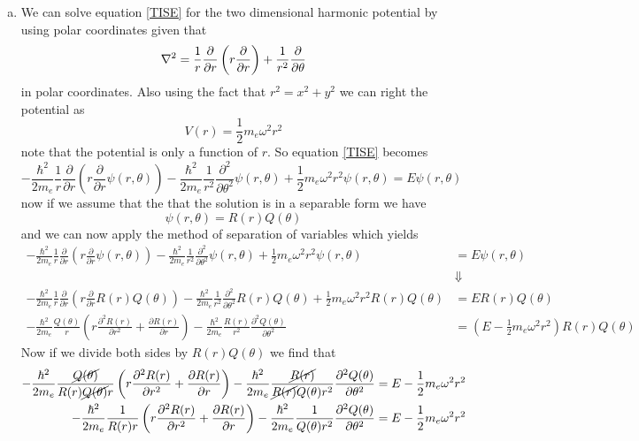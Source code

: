 \documentclass[11pt]{article}
\numberwithin{equation}{section}
\begin{document}
\begin{enumerate}[(a)]
\item
We can solve equation \ref{TISE} for the two dimensional harmonic potential by using polar coordinates given that
$$\bold\nabla^2 = \frac{1}{r}\frac{\partial}{\partial r}\left(r\frac{\partial}{\partial r}\right) + \frac{1}{r^2}\frac{\partial}{\partial\theta}$$
in polar coordinates. Also using the fact that $r^2 = x^2+y^2$ we can right the potential as
$$V(r) = \frac{1}{2}m_e\omega^2r^2$$
note that the potential is only a function of $r$. So equation \ref{TISE} becomes
$$-\frac{\hbar^2}{2m_e}\frac{1}{r}\frac{\partial}{\partial r}\left(r\frac{\partial}{\partial r}\psi(r,\theta)\right) - \frac{\hbar^2}{2m_e}\frac{1}{r^2}\frac{\partial^2}{\partial\theta^2}\psi(r,\theta) + \frac{1}{2}m_e\omega^2r^2\psi(r,\theta) = E\psi(r,\theta)$$
now if we assume that the that the solution is in a separable form we have
$$\psi(r,\theta ) = R(r)Q(\theta)$$
and we can now apply the method of separation of variables which yields
\begin{align*}
-\frac{\hbar^2}{2m_e}\frac{1}{r}\frac{\partial}{\partial r}\left(r\frac{\partial}{\partial r}\psi(r,\theta)\right) - \frac{\hbar^2}{2m_e}\frac{1}{r^2}\frac{\partial^2}{\partial\theta^2}\psi(r,\theta) + \frac{1}{2}m_e\omega^2r^2\psi(r,\theta) &= E\psi(r,\theta) \\
&\Downarrow \\
-\frac{\hbar^2}{2m_e}\frac{1}{r}\frac{\partial}{\partial r}\left(r\frac{\partial}{\partial r}R(r)Q(\theta)\right) - \frac{\hbar^2}{2m_e}\frac{1}{r^2}\frac{\partial^2}{\partial\theta^2}R(r)Q(\theta) + \frac{1}{2}m_e\omega^2r^2R(r)Q(\theta) &= ER(r)Q(\theta)\\
-\frac{\hbar^2}{2m_e}\frac{Q(\theta)}{r}\left(r\frac{\partial^2 R(r)}{\partial r^2} + \frac{\partial R(r)}{\partial r}\right) - \frac{\hbar^2}{2m_e}\frac{R(r)}{r^2}\frac{\partial^2 Q(\theta)}{\partial\theta^2} &= \left(E -\frac{1}{2}m_e\omega^2r^2\right)R(r)Q(\theta)
\end{align*}
Now if we divide both sides by $R(r)Q(\theta)$ we find that
\begin{align*}
-\frac{\hbar^2}{2m_e}\frac{\cancel{Q(\theta)}}{R(r)\cancel{Q(\theta)}r}\left(r\frac{\partial^2 R(r)}{\partial r^2} + \frac{\partial R(r)}{\partial r}\right) - \frac{\hbar^2}{2m_e}\frac{\cancel{R(r)}}{\cancel{R(r)}Q(\theta)r^2}\frac{\partial^2 Q(\theta)}{\partial\theta^2} &= E -\frac{1}{2}m_e\omega^2r^2\\
-\frac{\hbar^2}{2m_e}\frac{1}{R(r)r}\left(r\frac{\partial^2 R(r)}{\partial r^2} + \frac{\partial R(r)}{\partial r}\right) - \frac{\hbar^2}{2m_e}\frac{1}{Q(\theta)r^2}\frac{\partial^2 Q(\theta)}{\partial\theta^2} &= E -\frac{1}{2}m_e\omega^2r^2\\

\end{align*}
\end{enumerate}
\end{document}

